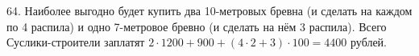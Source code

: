 64. Наиболее выгодно будет купить два 10-метровых бревна (и сделать на каждом по 4 распила) и одно 7-метровое бревно (и сделать на нём 3 распила). Всего Суслики-строители заплатят $2\cdot1200+900+(4\cdot2+3)\cdot100=4400$ рублей.\\
